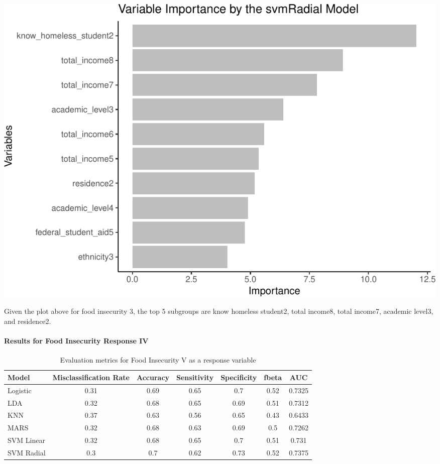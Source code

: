 \documentclass[
  10pt,
]{article}
\begin{document}
\begin{center}\includegraphics{phase2_report_files/figure-latex/unnamed-chunk-28-1} \end{center}

Given the plot above for food insecurity 3, the top 5 subgroups are know homeless student2, total income8, total income7, academic level3, and residence2.

\hypertarget{results-for-food-insecurity-response-iv}{%
\paragraph{Results for Food Insecurity Response IV}\label{results-for-food-insecurity-response-iv}}

\begin{table}[H]

\caption{\label{tab:unnamed-chunk-29}Evaluation metrics for Food Insecurity V  as a response variable}
\centering
\fontsize{12}{14}\selectfont
\begin{tabular}[t]{lcccccc}
\toprule
Model & Misclassification Rate & Accuracy & Sensitivity & Specificity & fbeta & AUC\\
\midrule
Logistic & 0.31 & 0.69 & 0.65 & 0.7 & 0.52 & 0.7325\\
LDA & 0.32 & 0.68 & 0.65 & 0.69 & 0.51 & 0.7312\\
KNN & 0.37 & 0.63 & 0.56 & 0.65 & 0.43 & 0.6433\\
MARS & 0.32 & 0.68 & 0.63 & 0.69 & 0.5 & 0.7262\\
SVM Linear & 0.32 & 0.68 & 0.65 & 0.7 & 0.51 & 0.731\\
SVM Radial & 0.3 & 0.7 & 0.62 & 0.73 & 0.52 & 0.7375\\
\bottomrule
\end{tabular}
\end{table}
\end{document}

